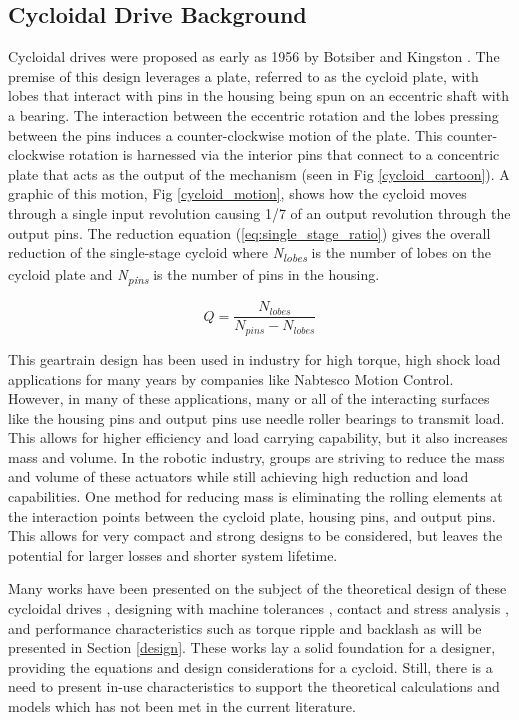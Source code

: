 \subsection{Cycloidal Drive Background}
Cycloidal drives were proposed as early as 1956 by Botsiber and Kingston \cite{1956}.
The premise of this design leverages a plate, referred to as the cycloid plate, with lobes that interact with pins in the housing being spun on an eccentric shaft with a bearing.
The interaction between the eccentric rotation and the lobes pressing between the pins induces a counter-clockwise motion of the plate. This counter-clockwise rotation is harnessed via the interior pins that connect to a concentric plate that acts as the output of the mechanism (seen in Fig \ref{cycloid_cartoon}). A graphic of this motion, Fig \ref{cycloid_motion}, shows how the cycloid moves through a single input revolution causing 1/7 of an output revolution through the output pins. 
The reduction equation (\ref{eq:single_stage_ratio}) gives the overall reduction of the single-stage cycloid where \textit{N\textsubscript{lobes}} is the number of lobes on the cycloid plate and \textit{N\textsubscript{pins}} is the number of pins in the housing. 

\begin{equation} \label{eq:single_stage_ratio}
Q = \frac{N_{lobes}} {N_{pins} - N_{lobes}}
\end{equation}

This geartrain design has been used in industry for high torque, high shock load applications for many years by companies like Nabtesco Motion Control.
However, in many of these applications, many or all of the interacting surfaces like the housing pins and output pins use needle roller bearings to transmit load.
This allows for higher efficiency and load carrying capability, but it also increases mass and volume.
In the robotic industry, groups are striving to reduce the mass and volume of these actuators while still achieving high reduction and load capabilities.
One method for reducing mass is eliminating the rolling elements at the interaction points between the cycloid plate, housing pins, and output pins.
This allows for very compact and strong designs to be considered, but leaves the potential for larger losses and shorter system lifetime.

Many works have been presented on the subject of the theoretical design of these cycloidal drives \cite{on_the_lobe} \cite{hwang_hsieh}, designing with machine tolerances \cite{design_and_application}, contact and stress analysis \cite{li}, and performance characteristics such as torque ripple and backlash \cite{hsieh_traditional} \cite{hsieh_dynamics} as will be presented in Section \ref{design}.
These works lay a solid foundation for a designer, providing the equations and design considerations for a cycloid.
Still, there is a need to present in-use characteristics to support the theoretical calculations and models which has not been met in the current literature.

